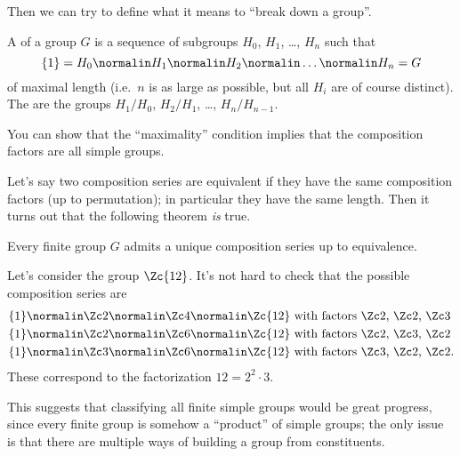 Then we can try to define what it means to ``break down a group''.
\begin{definition}
	A  of a group $G$ is a sequence of subgroups
	$H_0$, $H_1$, \dots, $H_n$ such that
	\[ \{1\} = H_0 \normalin H_1 \normalin H_2 \normalin \dots
		\normalin H_n = G \]
	of maximal length (i.e.\ $n$ is as large as possible,
	but all $H_i$ are of course distinct).
	The  are the groups
	$H_1/H_0$, $H_2/H_1$, \dots, $H_n/H_{n-1}$.
\end{definition}
You can show that the ``maximality'' condition implies that the composition factors are all simple groups.

Let's say two composition series are equivalent if they have the same composition factors (up to permutation); in particular they have the same length.
Then it turns out that the following theorem \emph{is} true.
\begin{theorem}
	Every finite group $G$ admits a unique composition series up to equivalence.
\end{theorem}

\begin{example}
	[Fundamental theorem of arithmetic when $n=12$]
	Let's consider the group $\Zc{12}$.
	It's not hard to check that the possible composition series are
	\begin{align*}
		\{1\} \normalin \Zc2 \normalin \Zc4 \normalin \Zc{12}
		& \text{ with factors $\Zc2$, $\Zc2$, $\Zc3$} \\
		\{1\} \normalin \Zc2 \normalin \Zc6 \normalin \Zc{12}
		& \text{ with factors $\Zc2$, $\Zc3$, $\Zc2$} \\
		\{1\} \normalin \Zc3 \normalin \Zc6 \normalin \Zc{12}
		& \text{ with factors $\Zc3$, $\Zc2$, $\Zc2$}.
	\end{align*}
	These correspond to the factorization $12 = 2^2 \cdot 3$.
\end{example}

This suggests that classifying all finite simple groups would be great progress, since every finite group is somehow a ``product'' of simple groups;
the only issue is that there are multiple ways of building a group from constituents.

